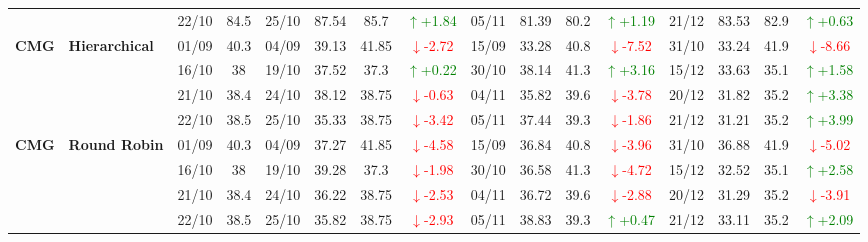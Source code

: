 \documentclass{ieeeaccess}
\begin{document}
{\begin{longtable}{llcc|cccc|cccc|cccc}
&
& 22/10 & 84.5 & 25/10 & 87.54 & 85.7 & \textcolor{green}{\(\uparrow\)+1.84} & 05/11 & 81.39 & 80.2 & \textcolor{green}{\(\uparrow\)+1.19} & 21/12 & 83.53 & 82.9 & \textcolor{green}{\(\uparrow\)+0.63} \\






\multirow{4}{*}{\textbf{CMG}} 
& \textbf{Hierarchical}
& 01/09 & 40.3 & 04/09 & 39.13 & 41.85 & \textcolor{red}{\(\downarrow\)-2.72} & 15/09 & 33.28 & 40.8 & \textcolor{red}{\(\downarrow\)-7.52} & 31/10 & 33.24 & 41.9 & \textcolor{red}{\(\downarrow\)-8.66} \\

& 
& 16/10 & 38 & 19/10 & 37.52 & 37.3 & \textcolor{green}{\(\uparrow\)+0.22} & 30/10 & 38.14 & 41.3 & \textcolor{green}{\(\uparrow\)+3.16} & 15/12 & 33.63 & 35.1 & \textcolor{green}{\(\uparrow\)+1.58} \\

& 
& 21/10 & 38.4 & 24/10 & 38.12 & 38.75 & \textcolor{red}{\(\downarrow\)-0.63} & 04/11 & 35.82 & 39.6 & \textcolor{red}{\(\downarrow\)-3.78} & 20/12 & 31.82 & 35.2 & \textcolor{green}{\(\uparrow\)+3.38} \\

&
& 22/10 & 38.5 & 25/10 & 35.33 & 38.75 & \textcolor{red}{\(\downarrow\)-3.42} & 05/11 & 37.44 & 39.3 & \textcolor{red}{\(\downarrow\)-1.86} & 21/12 & 31.21 & 35.2 & \textcolor{green}{\(\uparrow\)+3.99} \\
\midrule


\multirow{4}{*}{\textbf{CMG}} 
& \textbf{Round Robin}
& 01/09 & 40.3 & 04/09 & 37.27 & 41.85 & \textcolor{red}{\(\downarrow\)-4.58} & 15/09 & 36.84 & 40.8 & \textcolor{red}{\(\downarrow\)-3.96} & 31/10 & 36.88 & 41.9 & \textcolor{red}{\(\downarrow\)-5.02} \\

& 
& 16/10 & 38 & 19/10 & 39.28 & 37.3 & \textcolor{red}{\(\downarrow\)-1.98} & 30/10 & 36.58 & 41.3 & \textcolor{red}{\(\downarrow\)-4.72} & 15/12 & 32.52 & 35.1 & \textcolor{green}{\(\uparrow\)+2.58} \\

& 
& 21/10 & 38.4 & 24/10 & 36.22 & 38.75 & \textcolor{red}{\(\downarrow\)-2.53} & 04/11 & 36.72 & 39.6 & \textcolor{red}{\(\downarrow\)-2.88} & 20/12 & 31.29 & 35.2 & \textcolor{red}{\(\downarrow\)-3.91} \\

&
& 22/10 & 38.5 & 25/10 & 35.82 & 38.75 & \textcolor{red}{\(\downarrow\)-2.93} & 05/11 & 38.83 & 39.3 & \textcolor{green}{\(\uparrow\)+0.47} & 21/12 & 33.11 & 35.2 & \textcolor{green}{\(\uparrow\)+2.09} \\
\midrule



\end{longtable}}
\end{document}
